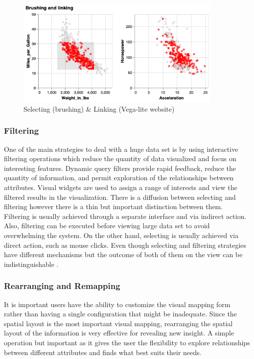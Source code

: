 \begin{figure}[H]
\centering
\captionsetup{justification=centering}
\includegraphics[width=0.9\textwidth]{Report-latex/tex_files/pics/brlink2.png}
\caption{Selecting (brushing) \& Linking (Vega-lite website)}
\end{figure}


\subsubsection{Filtering}

One of the main strategies to deal with a huge data set is by using interactive filtering operations which reduce the quantity of data visualized and focus on interesting features. Dynamic query filters provide rapid feedback, reduce the quantity of information, and permit exploration of the relationships between attributes. Visual widgets are used to assign a range of interests and view the filtered results in the visualization. There is a diffusion between selecting and filtering however there is a thin but important distinction between them. Filtering is usually achieved through a separate interface and via indirect action. Also, filtering can be executed before viewing large data set to avoid overwhelming the system. On the other hand, selecting is usually achieved via direct action, such as mouse clicks. Even though selecting and filtering strategies have different mechanisms but the outcome of both of them on the view can be indistinguishable \cite{ward2015interactive}.

\subsubsection{Rearranging and Remapping}

It is important users have the ability to customize the visual mapping form rather than having a single configuration that might be inadequate. Since the spatial layout is the most important visual mapping, rearranging the spatial layout of the information is very effective for revealing new insight. A simple operation but important as it gives the user the flexibility to explore relationships between different attributes and finds what best suits their needs.